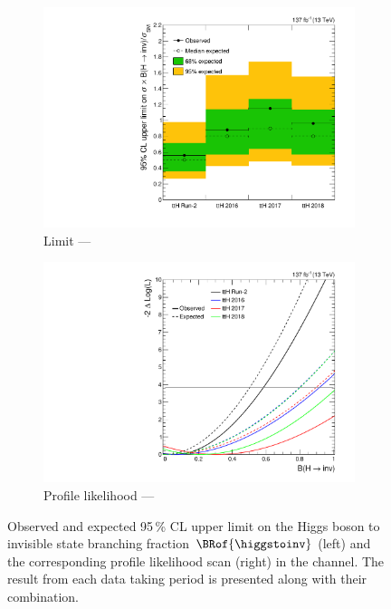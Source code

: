 \begin{figure}[htbp]
    \centering
    \begin{subfigure}[t]{0.49\textwidth}
        \includegraphics[width=\textwidth]{figures/limits/ttH/limit_Run2_ttH.pdf}
        \caption{Limit --- \ttH}
    \end{subfigure}
    \hfill
    \begin{subfigure}[t]{0.49\textwidth}
        \includegraphics[width=\textwidth]{figures/likelihood_scan/profile_likelihood_scan_Run2_ttH.pdf}
        \caption{Profile likelihood --- \ttH}
    \end{subfigure}
    \caption[Observed and expected 95\,\% CL upper limit on the Higgs boson to invisible state branching fraction $\BRof{\higgstoinv}$ (left) and the corresponding profile likelihood scan (right) in the \ttH channel]{Observed and expected 95\,\% CL upper limit on the Higgs boson to invisible state branching fraction $\BRof{\higgstoinv}$ (left) and the corresponding profile likelihood scan (right) in the \ttH channel. The result from each data taking period is presented along with their combination.}
    \label{fig:htoinv_limit_ttH}
\end{figure}

